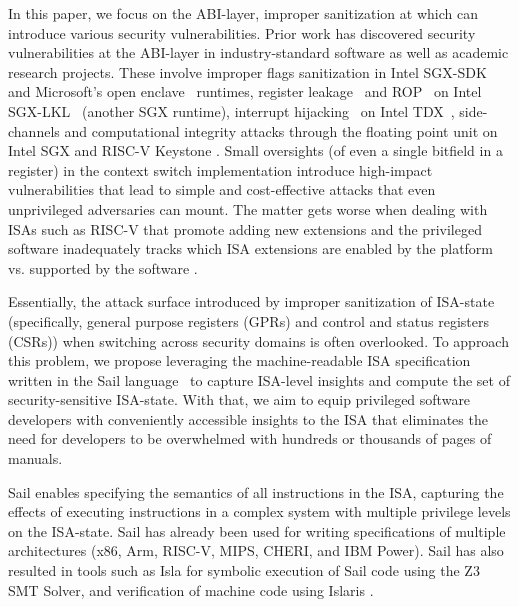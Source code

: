 In this paper, we focus on the ABI-layer, improper sanitization at which can introduce various security vulnerabilities. 
Prior work has discovered security vulnerabilities at the ABI-layer in industry-standard software as well as academic research projects. 
These involve improper flags sanitization \cite{totw} in Intel SGX-SDK~\cite{sgx-sdk} and Microsoft's open enclave~\cite{ms-open-enclave} runtimes,
register leakage~\cite{guard-dilemma} and ROP~\cite{rop-sgx} on Intel SGX-LKL~\cite{sgx-lkl} (another SGX runtime), interrupt hijacking~\cite{intel-tdx-sec} on Intel TDX~\cite{intel-tdx}, side-channels and computational integrity attacks through the floating point unit on Intel SGX and RISC-V Keystone \cite{dtrap-fpu, keystone}. 
Small oversights (of even a single bitfield in a register) in the context switch implementation introduce high-impact vulnerabilities that lead to simple and cost-effective attacks that even unprivileged adversaries can mount. 
The matter gets worse when dealing with ISAs such as RISC-V that promote adding new extensions and the privileged software inadequately tracks which ISA extensions are enabled by the platform vs. supported by the software \cite{dtrap-fpu}. 







Essentially, the attack surface introduced by improper sanitization of ISA-state (specifically, general purpose registers (GPRs) and control and status registers (CSRs)) when switching across security domains is often overlooked. 
To approach this problem, we propose leveraging the machine-readable ISA specification written in the Sail language~\cite{sail} to capture ISA-level insights and compute the set of security-sensitive ISA-state. 
With that, we aim to equip privileged software developers with conveniently accessible insights to the ISA that eliminates the need for developers to be overwhelmed with hundreds or thousands of pages of manuals. 

Sail enables specifying the semantics of all instructions in the ISA, capturing the effects of executing instructions in a complex system with multiple privilege levels on the ISA-state. 
Sail has already been used for writing specifications of multiple architectures (x86, Arm, RISC-V, MIPS, CHERI, and IBM Power).   
Sail has also resulted in tools such as Isla \cite{isla} for symbolic execution of Sail code using the Z3 SMT Solver, and verification of machine code using Islaris \cite{islaris}. 




